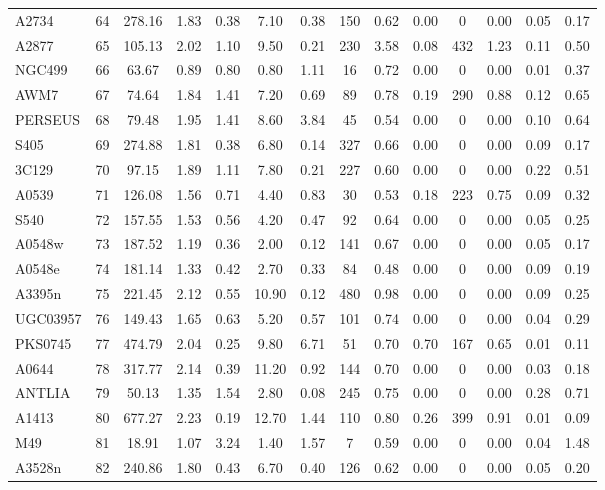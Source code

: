 \documentclass[10pt,aps,pra,reprint,amsmath,amsfonts,amssymb,showpacs,nofootinbib,floatfix]{revtex4-1}
\newcommand{\vst}{\vspace{-0.14mm}}
\begin{document}
{\begin{table}
\begin{minipage}{2.0\columnwidth}
\begin{tabular}{l c c c c c c c c c c c c c}
A2734 & 64 & 278.16 & 1.83 & 0.38 & 7.10 & 0.38 & 150 & 0.62 & 0.00 & 0 & 0.00 & 0.05 & 0.17 \vst \\
A2877 & 65 & 105.13 & 2.02 & 1.10 & 9.50 & 0.21 & 230 & 3.58 & 0.08 & 432 & 1.23 & 0.11 & 0.50 \vst \\
NGC499 & 66 & 63.67 & 0.89 & 0.80 & 0.80 & 1.11 & 16 & 0.72 & 0.00 & 0 & 0.00 & 0.01 & 0.37 \vst \\
AWM7 & 67 & 74.64 & 1.84 & 1.41 & 7.20 & 0.69 & 89 & 0.78 & 0.19 & 290 & 0.88 & 0.12 & 0.65 \vst \\
PERSEUS & 68 & 79.48 & 1.95 & 1.41 & 8.60 & 3.84 & 45 & 0.54 & 0.00 & 0 & 0.00 & 0.10 & 0.64 \vst \\
S405 & 69 & 274.88 & 1.81 & 0.38 & 6.80 & 0.14 & 327 & 0.66 & 0.00 & 0 & 0.00 & 0.09 & 0.17 \vst \\
3C129 & 70 & 97.15 & 1.89 & 1.11 & 7.80 & 0.21 & 227 & 0.60 & 0.00 & 0 & 0.00 & 0.22 & 0.51 \vst \\
A0539 & 71 & 126.08 & 1.56 & 0.71 & 4.40 & 0.83 & 30 & 0.53 & 0.18 & 223 & 0.75 & 0.09 & 0.32 \vst \\
S540 & 72 & 157.55 & 1.53 & 0.56 & 4.20 & 0.47 & 92 & 0.64 & 0.00 & 0 & 0.00 & 0.05 & 0.25 \vst \\
A0548w & 73 & 187.52 & 1.19 & 0.36 & 2.00 & 0.12 & 141 & 0.67 & 0.00 & 0 & 0.00 & 0.05 & 0.17 \vst \\
A0548e & 74 & 181.14 & 1.33 & 0.42 & 2.70 & 0.33 & 84 & 0.48 & 0.00 & 0 & 0.00 & 0.09 & 0.19 \vst \\
A3395n & 75 & 221.45 & 2.12 & 0.55 & 10.90 & 0.12 & 480 & 0.98 & 0.00 & 0 & 0.00 & 0.09 & 0.25 \vst \\
UGC03957 & 76 & 149.43 & 1.65 & 0.63 & 5.20 & 0.57 & 101 & 0.74 & 0.00 & 0 & 0.00 & 0.04 & 0.29 \vst \\
PKS0745 & 77 & 474.79 & 2.04 & 0.25 & 9.80 & 6.71 & 51 & 0.70 & 0.70 & 167 & 0.65 & 0.01 & 0.11 \vst \\
A0644 & 78 & 317.77 & 2.14 & 0.39 & 11.20 & 0.92 & 144 & 0.70 & 0.00 & 0 & 0.00 & 0.03 & 0.18 \vst \\
ANTLIA & 79 & 50.13 & 1.35 & 1.54 & 2.80 & 0.08 & 245 & 0.75 & 0.00 & 0 & 0.00 & 0.28 & 0.71 \vst \\
A1413 & 80 & 677.27 & 2.23 & 0.19 & 12.70 & 1.44 & 110 & 0.80 & 0.26 & 399 & 0.91 & 0.01 & 0.09 \vst \\
M49 & 81 & 18.91 & 1.07 & 3.24 & 1.40 & 1.57 & 7 & 0.59 & 0.00 & 0 & 0.00 & 0.04 & 1.48 \vst \\
A3528n & 82 & 240.86 & 1.80 & 0.43 & 6.70 & 0.40 & 126 & 0.62 & 0.00 & 0 & 0.00 & 0.05 & 0.20 \vst \\

\end{tabular}
\end{minipage}
\end{table}}
\end{document}
